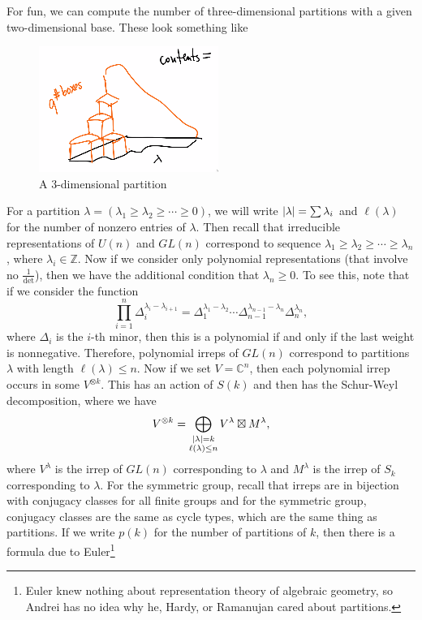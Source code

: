 \documentclass[leqno, openany]{memoir}
\theoremstyle{definition}
\theoremstyle{remark}
\theoremstyle{plain}
\theoremstyle{definition}
\theoremstyle{remark}
\newcommand{\C}{\mathbb{C}}
\newcommand{\Z}{\mathbb{Z}}
\begin{document}
For fun, we can compute the number of three-dimensional partitions with a given two-dimensional base. These look something like
\begin{figure}[H]
    \centering
    \includegraphics[scale=0.8]{3dpartition}
    \caption{A $3$-dimensional partition}%
    \label{fig:3dpartition}
\end{figure}

For a partition $\lambda = (\lambda_1 \geq \lambda_2 \geq \cdots \geq 0)$, we will write $\abs{\lambda} = \sum \lambda_i$ and $\ell(\lambda)$ for the number of nonzero entries of $\lambda$. Then recall that irreducible representations of $U(n)$ and $GL(n)$ correspond to sequence $\lambda_1 \geq \lambda_2 \geq \cdots \geq \lambda_n$, where $\lambda_i \in \Z$. Now if we consider only polynomial representations (that involve no $\frac{1}{\det}$), then we have the additional condition that $\lambda_n \geq 0$. To see this, note that if we consider the function
\[ \prod_{i=1}^n \Delta_i^{\lambda_i - \lambda_{i+1}} = \Delta_1^{\lambda_1 - \lambda_2} \cdots \Delta_{n-1}^{\lambda_{n-1} - \lambda_n} \Delta_n^{\lambda_n}, \]
where $\Delta_i$ is the $i$-th minor, then this is a polynomial if and only if the last weight is nonnegative. Therefore, polynomial irreps of $GL(n)$ correspond to partitions $\lambda$ with length $\ell(\lambda) \leq n$. Now if we set $V = \C^n$, then each polynomial irrep occurs in some $V^{\otimes k}$. This has an action of $S(k)$ and then has the Schur-Weyl decomposition, where we have
\[ V^{\otimes k} = \bigoplus_{\substack{\abs{\lambda} = k \\ \ell(\lambda) \leq n}} V^{\lambda} \boxtimes M^{\lambda}, \]
where $V^{\lambda}$ is the irrep of $GL(n)$ corresponding to $\lambda$ and $M^{\lambda}$ is the irrep of $S_k$ corresponding to $\lambda$. For the symmetric group, recall that irreps are in bijection with conjugacy classes for all finite groups and for the symmetric group, conjugacy classes are the same as cycle types, which are the same thing as partitions. If we write $p(k)$ for the number of partitions of $k$, then there is a formula due to Euler\footnote{Euler knew nothing about representation theory of algebraic geometry, so Andrei has no idea why he, Hardy, or Ramanujan cared about partitions.}
\end{document}
